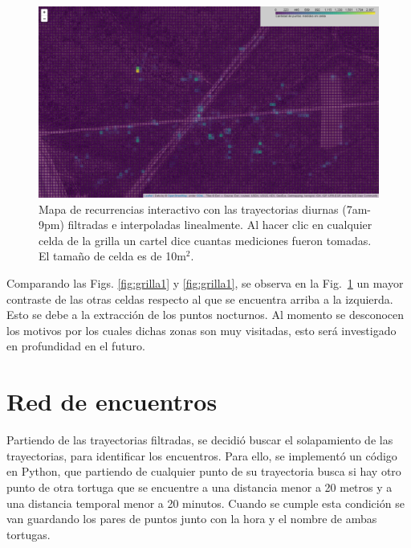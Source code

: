 \begin{figure}[ht]
    \begin{center}
       
   
    \includegraphics[width=\imsize]{Chap2/GrillaCintSNoche.png}
\end{center}
    \caption[Mapa con zona de recurrencia para trayectorias diurnas.]{Mapa de recurrencias  interactivo con las trayectorias diurnas (7am-9pm) filtradas e interpoladas linealmente. Al hacer clic en cualquier celda de la grilla un cartel dice cuantas mediciones fueron tomadas. El tamaño de celda es de 10m$^2$.}
    \label{fig:grillaInt}
\end{figure}


Comparando las Figs. \ref{fig:grilla1} y \ref{fig:grilla1}, se observa en la  Fig.~\ref{fig:grillaInt} un mayor contraste de las otras celdas respecto al que se encuentra arriba a la izquierda. Esto se debe a la extracción de los puntos nocturnos. Al momento se desconocen los motivos por los cuales dichas zonas son muy visitadas, esto será investigado en profundidad en el futuro.
 
\section{Red de encuentros}
Partiendo de las trayectorias filtradas, se decidió buscar el solapamiento de las trayectorias, para identificar los encuentros. Para ello, se implementó un código en Python, que partiendo de cualquier punto de su trayectoria busca si hay otro punto de otra tortuga que se encuentre a una distancia menor a 20 metros y a una distancia temporal menor a 20 minutos. Cuando se cumple esta condición se van guardando los pares de puntos junto con la hora y el nombre de ambas tortugas.
 
